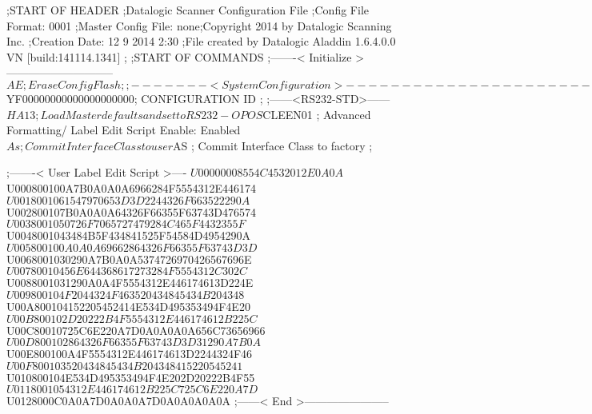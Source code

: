 ;START OF HEADER
;Datalogic Scanner Configuration File
;Config File Format: 0001
;Master Config File: none;Copyright 2014 by Datalogic Scanning Inc.
;Creation Date: 12 9 2014 2:30
;File created by Datalogic Aladdin 1.6.4.0.0 VN [build:141114.1341]
;
;START OF COMMANDS
;-------< Initialize >-----------------------------
$AE                 ; Erase Config Flash
;
;-------< System Configuration >-------------------------------
$YF00000000000000000000; CONFIGURATION ID
;
;------<RS232-STD>------
$HA13               ; Load Master defaults and set to RS232-OPOS
$CLEEN01            ; Advanced Formatting/ Label Edit Script Enable: Enabled
$As                 ; Commit Interface Class to user
$AS                 ; Commit Interface Class to factory
;

;-------< User Label Edit Script >----
$U00000008554C4532012E0A0A
$U000800100A7B0A0A0A6966284F5554312E446174
$U0018001061547970653D3D2244326F663522290A
$U002800107B0A0A0A64326F66355F63743D476574
$U0038001050726F7065727479284C465F4432355F
$U0048001043484B5F434841525F54584D4954290A
$U005800100A0A0A69662864326F66355F63743D3D
$U0068001030290A7B0A0A5374726970426567696E
$U00780010456E644368617273284F5554312C302C
$U0088001031290A0A4F5554312E446174613D224E
$U009800104F2044324F463520434845434B204348
$U00A800104152205452414E534D495353494F4E20
$U00B800102D20222B4F5554312E446174612B225C
$U00C80010725C6E220A7D0A0A0A0A656C73656966
$U00D800102864326F66355F63743D3D31290A7B0A
$U00E800100A4F5554312E446174613D2244324F46
$U00F800103520434845434B204348415220545241
$U010800104E534D495353494F4E202D20222B4F55
$U0118001054312E446174612B225C725C6E220A7D
$U0128000C0A0A7D0A0A0A7D0A0A0A0A0A
;------< End >-----------------------
